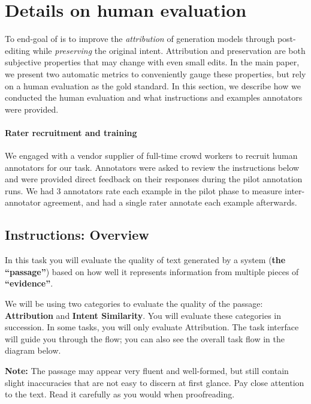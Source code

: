 \documentclass[11pt]{article}
\begin{document}
\section{Details on human evaluation}
\label{sec:app-human-eval}

To end-goal of \approach{} is to improve the \textit{attribution} of generation models through post-editing while \textit{preserving} the original intent.
Attribution and preservation are both subjective properties that may change with even small edits.
In the main paper, we present two automatic metrics to conveniently gauge these properties, but rely on a human evaluation as the gold standard.
In this section, we describe how we conducted the human evaluation and what instructions and examples annotators were provided.

\paragraph{Rater recruitment and training}
We engaged with a vendor supplier of full-time crowd workers to recruit human annotators for our task.
Annotators were asked to review the instructions below and were provided direct feedback on their responses during the pilot annotation runs.
We had 3 annotators rate each example in the pilot phase to measure inter-annotator agreement, and had a single rater annotate each example afterwards.

\subsection{Instructions: Overview}

In this task you will evaluate the quality of text generated by a system (\textbf{the ``passage''}) based on how well it represents information from multiple pieces of \textbf{``evidence''}.

We will be using two categories to evaluate the quality of the passage: \textbf{Attribution} and \textbf{Intent Similarity}. You will evaluate these categories in succession. In some tasks, you will only evaluate Attribution. The task interface will guide you through the flow; you can also see the overall task flow in the diagram below. 

\textbf{Note:} The passage may appear very fluent and well-formed, but still contain slight inaccuracies that are not easy to discern at first glance. Pay close attention to the text. Read it carefully as you would when proofreading.
\end{document}
